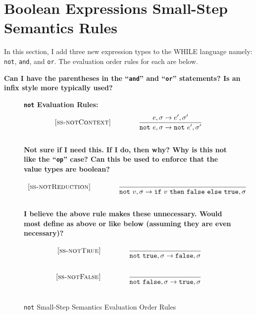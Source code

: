 \documentclass{article}
\newcommand{\ife}[3]{\mbox{\tt if}~{#1}~\mbox{\tt then}~{#2}~\mbox{\tt else}~{#3}}
\newcommand{\note}[1]{\mbox{\tt not}~#1}
\newcommand{\true}{\mbox{\tt true}}
\newcommand{\false}{\mbox{\tt false}}
\begin{document}
\section{Boolean Expressions Small-Step Semantics Rules}


In this section, I add three new expression types to the WHILE language namely: {\tt not}, {\tt and}, and {\tt or}.  The evaluation order rules for each are below.


\bf Can I have the parentheses in the ``{\tt and}'' and ``{\tt or}'' statements?  Is an infix style more typically used?

\begin{figure}[H]\label{fig:notRules}
\caption{{\tt not} Small-Step Semantics Evaluation Order Rules}
{\bf {\tt not} Evaluation Rules:} 
\[
\\
\begin{array}{r@{\qquad\qquad}l}
\ssrule{ss-notContext}{
  \sstep{e}{\sigma}{e'}{\sigma'}
}{
  \sstep{\note{e}}{\sigma}{\note{e'}}{\sigma'}
}
\end{array}
\]
{\bf Not sure if I need this.  If I do, then why?  Why is this not like the  ``{\tt op}'' case?  Can this be used to enforce that the value types are boolean?} 
\[
\\
\begin{array}{r@{\qquad\qquad}l}
\ssrule{ss-notReduction}{
}{
  \sstep{\note{v}}{\sigma}{\ife{v}{\false}{\true}}{\sigma}
}
\end{array}
\]
{\bf I believe the above rule makes these unnecessary.  Would most define as above or like below (assuming they are even necessary)?} 
\[
\\
\begin{array}{r@{\qquad\qquad}l}
\ssrule{ss-notTrue}{
}{
  \sstep{\note{\true}}{\sigma}{\false}{\sigma}
}
\ssrule{ss-notFalse}{
}{
  \sstep{\note{\false}}{\sigma}{\true}{\sigma}
}
\end{array}
\]
\end{figure}
\end{document}
